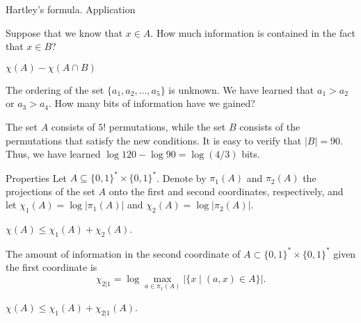\documentclass[handout,aspectratio=169]{beamer}
\newcommand{\bits}{\{0,1\}}
\newcommand{\bitstr}{\bits^*}
\newcommand{\seqn}[2]{{#1}_1,{#1}_2,\dotsc,{#1}_{#2}}
\begin{document}
\begin{frame}{Hartley's formula. Application}
\begin{example}
Suppose that we know that $x\in A$. How much information is contained in the fact that $x\in B$?
\end{example}
\pause
\begin{solution}
\(\chi(A) - \chi(A\cap B)\)
\end{solution}
\pause
\begin{example}
    The ordering of the set $\{\seqn{a}{5}\}$ is unknown. We have learned that \(a_1>a_2\) or \(a_3>a_4\). How many bits of information have we gained?
\end{example}
\pause
\begin{solution}
    The set \(A\) consists of \(5!\) permutations, while the set \(B\) consists of the permutations that satisfy the new conditions. It is easy to verify that \(|B| = 90\).
    \\Thus, we have learned \(\log 120 - \log 90 = \log(4/3)\) bits.
\end{solution}
\end{frame}

\begin{frame}{Properties}
Let \(A\subseteq\bitstr\times\bitstr\). Denote by \(\pi_1(A)\) and \(\pi_2(A)\) the projections of the set \(A\) onto the first and second coordinates, respectively, and let \(\chi_1(A) = \log|\pi_1(A)|\) and \(\chi_2(A) = \log|\pi_2(A)|\).

\begin{theorem}
    \(\chi(A) \le \chi_1(A) + \chi_2(A)\).
\end{theorem}

\begin{definition}
    The amount of information in the second coordinate of \(A\subset\bitstr\times\bitstr\) given the first coordinate is
    \[\chi_{2|1} = \log\max_{a\in\pi_1(A)}\bigl|\{x \mid (a, x)\in A\}\bigr|.\]
\end{definition}\vspace{-5mm}
\begin{theorem}
    \(\chi(A) \le \chi_1(A) + \chi_{2|1}(A)\).
\end{theorem}
\end{frame}
\end{document}
